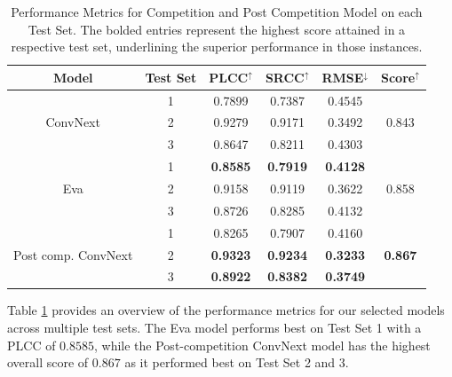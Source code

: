 \documentclass[a4paper,12pt,openright]{book}
\begin{document}
\begin{table}[h]

\smallskip
\begin{center}
\begin{tabular}{ | c | c | c | c | c | c | }
\hline  
  \textbf{Model} & \textbf{Test Set} & \textbf{PLCC$^{\uparrow}$} & \textbf{SRCC$^{\uparrow}$} & \textbf{RMSE$^{\downarrow}$} &
  \textbf{Score$^{\uparrow}$}\\ 
\hline  
  \multirow{3}{*}{ConvNext} & 1 & 0.7899 & 0.7387 & 0.4545 & \multirow{3}{*}{0.843} \\
                            & 2 & 0.9279 & 0.9171 & 0.3492 & \\
                            & 3 & 0.8647 & 0.8211 & 0.4303 & \\
\hline
  \multirow{3}{*}{Eva} & 1 & \textbf{0.8585} & \textbf{0.7919} & \textbf{0.4128} & \multirow{3}{*}{0.858}
  \\ & 2 & 0.9158 & 0.9119 & 0.3622 & \\
   & 3 & 0.8726 & 0.8285 & 0.4132 & \\
\hline

  \multirow{3}{*}{Post comp. ConvNext} & 1 & 0.8265 & 0.7907 & 0.4160 & \multirow{3}{*}{\textbf{0.867}} \\
                            & 2 & \textbf{0.9323} & \textbf{ 0.9234} & \textbf{0.3233}  & \\
                            & 3 & \textbf{ 0.8922} & \textbf{0.8382} & \textbf{0.3749} & \\
\hline  
\end{tabular}
\end{center}
\caption{Performance Metrics for Competition and Post Competition Model on each Test Set. The bolded entries represent the highest score attained in a respective test set, underlining the superior performance in those instances.}
\label{res_test}
\end{table}

Table \ref{res_test} provides an overview of the performance metrics for our selected models across multiple test sets. The Eva model performs best on Test Set 1 with a PLCC of \(0.8585\), while the Post-competition ConvNext model has the highest overall score of \(0.867\) as it performed best on Test Set 2 and 3.
\end{document}
